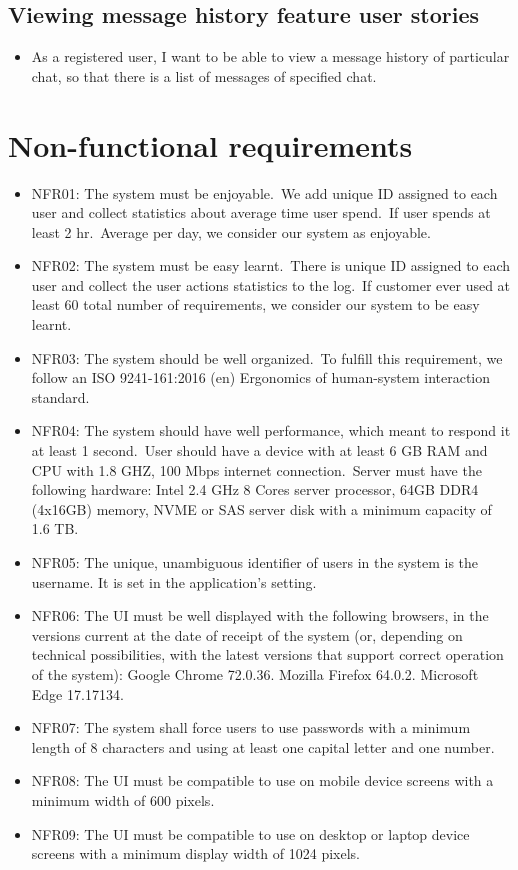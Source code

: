 \subsection{Viewing message history feature user stories}\label{subsec:viewing-message-history-feature-user-stories}
\begin{itemize}
    \item As a registered user, I want to be able to view a message history of particular chat, so that there is a list of messages of specified chat.
\end{itemize}


\section{Non-functional requirements}\label{sec:non-functional-requirements}
\begin{itemize}
    \item NFR01: The system must be enjoyable.\ We add unique ID assigned to each user and
    collect statistics about average time user spend.\ If user spends at least 2 hr.\ Average
    per day, we consider our system as enjoyable.
    \item NFR02: The system must be easy learnt.\ There is unique ID assigned to each user and
    collect the user actions statistics to the log.\ If customer ever used at least 60%
    total number of requirements, we consider our system to be easy learnt.
    \item NFR03: The system should be well organized.\ To fulfill this requirement, we follow an
    ISO 9241-161:2016 (en) Ergonomics of human-system interaction standard.
    \item NFR04: The system should have well performance, which meant to respond it at
    least 1 second.\ User should have a device with at least 6 GB RAM and CPU with 1.8
    GHZ, 100 Mbps internet connection.\ Server must have the following hardware: Intel
    2.4 GHz 8 Cores server processor, 64GB DDR4 (4x16GB) memory, NVME or SAS
    server disk with a minimum capacity of 1.6 TB.
    \item NFR05: The unique, unambiguous identifier of users in the system is the username. It
    is set in the application’s setting.
    \item NFR06: The UI must be well displayed with the following browsers, in the versions
    current at the date of receipt of the system (or, depending on technical possibilities,
    with the latest versions that support correct operation of the system):
    Google Chrome 72.0.36.
    Mozilla Firefox 64.0.2.
    Microsoft Edge 17.17134.
    \item NFR07: The system shall force users to use passwords with a minimum length of 8
    characters and using at least one capital letter and one number.
    \item NFR08: The UI must be compatible to use on mobile device screens with a minimum
    width of 600 pixels.
    \item NFR09: The UI must be compatible to use on desktop or laptop device screens with a
    minimum display width of 1024 pixels.
\end{itemize}